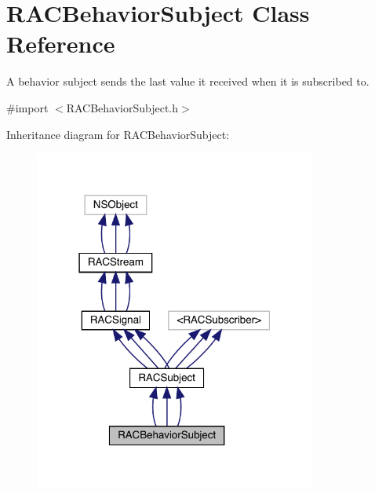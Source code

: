 \hypertarget{interface_r_a_c_behavior_subject}{}\section{R\+A\+C\+Behavior\+Subject Class Reference}
\label{interface_r_a_c_behavior_subject}


A behavior subject sends the last value it received when it is subscribed to.  




{\ttfamily \#import $<$R\+A\+C\+Behavior\+Subject.\+h$>$}



Inheritance diagram for R\+A\+C\+Behavior\+Subject\+:\nopagebreak
\begin{figure}[H]
\begin{center}
\leavevmode
\includegraphics[width=262pt]{interface_r_a_c_behavior_subject__inherit__graph}
\end{center}
\end{figure}


